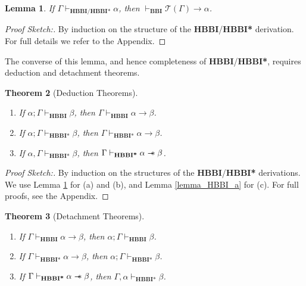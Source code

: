 \documentclass[a4paper]{article}
\newtheorem{theorem}{Theorem}[section]
\newtheorem{lemma}[theorem]{Lemma}
\newcommand\magicwand{\mathrel{-\mkern-6mu*}}
\newcommand{\BBI}{\textbf{BBI}\xspace}
\begin{document}
\begin{lemma}\label{HBBI_Completeness_b1} If $\Gamma \vdash_{\textbf{HBBI}/\textbf{HBBI*}} \alpha$, then $\vdash_{\BBI} \mathcal{T}(\Gamma) \rightarrow \alpha$. 
\end{lemma}

\begin{proof}[Proof Sketch:]

By induction on the structure of the \textbf{HBBI}/\textbf{HBBI*} derivation. For full details we refer to the Appendix.
\end{proof}

The converse of this lemma, and hence completeness of \textbf{HBBI}/\textbf{HBBI*}, 
requires deduction and detachment theorems.

\begin{theorem}[Deduction Theorems]\label{Deduction_theorem} \
\begin{enumerate}
    \item[(a)] If $\alpha; \Gamma \vdash_{\textbf{HBBI}} \beta$, then $\Gamma \vdash_{\textbf{HBBI}} \alpha \rightarrow \beta$.
    \item[(b)] If $\alpha; \Gamma \vdash_{\textbf{HBBI*}} \beta$, then $\Gamma \vdash_{\textbf{HBBI*}} \alpha \rightarrow \beta$.
    \item[(c)] If $\alpha, \Gamma \vdash_{\textbf{HBBI*}} \beta$, then $\Gamma \vdash_{\textbf{HBBI*}} \alpha \magicwand \beta$.
\end{enumerate}
    
\end{theorem}
\begin{proof}[Proof Sketch:] By induction on the structures of the \textbf{HBBI}/\textbf{HBBI*} derivations.
We use Lemma \ref{HBBI_Completeness_b1} for (a) and (b), and Lemma \ref{lemma_HBBI_a} for (c). For full proofs, see the Appendix.
\end{proof}

\begin{theorem}[Detachment Theorems] \label{detachment} \
\begin{enumerate}
    \item[(a)] If $\Gamma \vdash_{\textbf{HBBI}}\alpha \rightarrow \beta$, then $\alpha; \Gamma \vdash_{\textbf{HBBI}} \beta$.

    \item[(b)] If $\Gamma \vdash_{\textbf{HBBI*}}\alpha \rightarrow \beta$, then $\alpha; \Gamma \vdash_{\textbf{HBBI*}} \beta$.
    
    \item[(c)] If $\Gamma\vdash_{\textbf{HBBI*}}\alpha \magicwand \beta$, then $\Gamma, \alpha \vdash_{\textbf{HBBI*}} \beta$.\label{detachment_theorem_magicwand}    

\end{enumerate}

\end{theorem}
\end{document}
